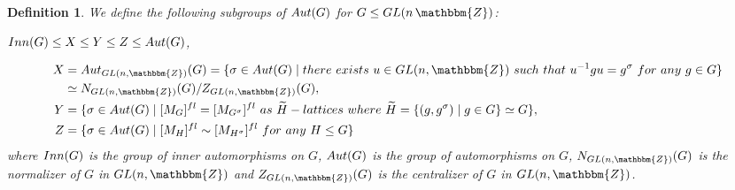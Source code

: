 \documentclass[10pt,a4paper]{amsart}
\newtheorem{definition}{Definition}
\newcommand{\GL}{{\rm GL}}\newcommand{\SL}{{\rm SL}}
\newcommand{\bZ}{\mathbbm{Z}}\newcommand{\bQ}{\mathbbm{Q}}
\begin{document}
\begin{definition}\label{defXYZ}
We define the following subgroups of ${\rm Aut}(G)$ for 
$G\leq {\rm GL}(n\,\bZ)$: 
\begin{center}
${\rm Inn}(G)\leq X\leq Y\leq Z\leq {\rm Aut}(G)$,
\end{center}
\begin{align*}
X&={\rm Aut}_{\GL(n,\bZ)}(G)=
\{\sigma\in{\rm Aut}(G)\mid 
{\rm there}\ {\rm exists}\ u\in {\rm GL}(n,\bZ)\ {\rm such}\ {\rm that}\ 
u^{-1}gu=g^\sigma\ {\rm for}\ {\rm any}\ g\in G\}\\
&\simeq N_{\GL(n,\bZ)}(G)/Z_{\GL(n,\bZ)}(G),\\
Y&=\{\sigma\in{\rm Aut}(G)\mid [M_G]^{fl}=[M_{G^\sigma}]^{fl}\ {\rm as}\ 
\widetilde{H}\textrm{-{\rm lattices}}\ {\rm where}\ \widetilde{H}=\{(g,g^\sigma)\mid g\in G\}\simeq G\},\\
Z&=\{\sigma\in{\rm Aut}(G)\mid [M_H]^{fl}\sim [M_{H^\sigma}]^{fl}\ {\rm for}\ {\rm any}\ H\leq G\} 
\end{align*}
where 
${\rm Inn}(G)$ is the group of inner automorphisms on $G$, 
${\rm Aut}(G)$ is the group of automorphisms on $G$, 
$N_{\GL(n,\bZ)}(G)$ is the normalizer of $G$ in $\GL(n,\bZ)$ and 
$Z_{\GL(n,\bZ)}(G)$ is the centralizer of $G$ in $\GL(n,\bZ)$.
%
%
\end{definition}
\end{document}
